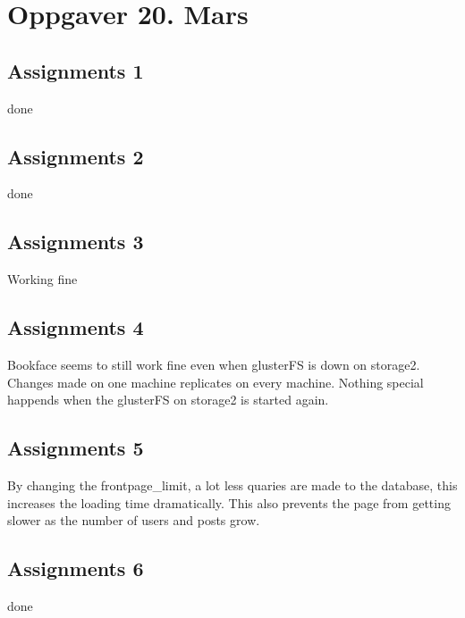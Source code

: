 \section{Oppgaver 20. Mars}

\subsection{Assignments 1} 
done

\subsection{Assignments 2} 
done

\subsection{Assignments 3} 
Working fine

\subsection{Assignments 4} 
Bookface seems to still work fine even when glusterFS is down on storage2. Changes made on one machine replicates on every machine. Nothing special happends when the glusterFS on storage2 is started again.

\subsection{Assignments 5} 
By changing the frontpage\_limit, a lot less quaries are made to the database, this increases the loading time dramatically. This also prevents the page from getting slower as the number of users and posts grow.

\subsection{Assignments 6} 
done